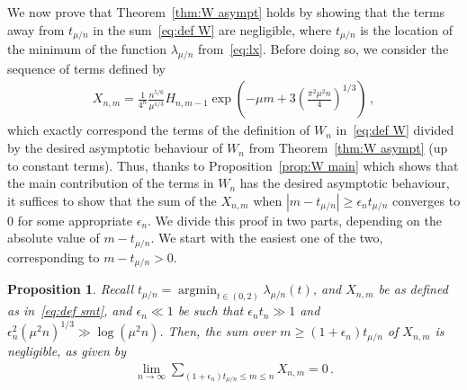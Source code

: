 \documentclass{article}
\DeclareMathOperator*{\argmin}{argmin}
\newcommand{\1}{\mathbbm{1}}								%
\newtheorem{proposition}[theorem]{Proposition}
\theoremstyle{definition}
\numberwithin{equation}{section}
\begin{document}
\def\smt{X}
We now prove that Theorem~\ref{thm:W asympt} holds by showing that the terms away from $t_{\mu/n}$ in the sum~\eqref{eq:def W} are negligible, where $t_{\mu/n}$ is the location of the minimum of the function $\lambda_{\mu/n}$ from~\eqref{eq:lx}. Before doing so, we consider the sequence of terms defined by
\begin{align}\label{eq:def smt}
    \smt_{n,m}=\frac{1}{4^n}\frac{n^{5/6}}{\mu^{1/3}}H_{n,m-1}\exp\left(-\mu m+3\left(\frac{\pi^2\mu^2n}{4}\right)^{1/3}\right)\,,
\end{align}
which exactly correspond the terms of the definition of $W_n$ in~\eqref{eq:def W} divided by the desired asymptotic behaviour of $W_n$ from Theorem~\ref{thm:W asympt} (up to constant terms).
Thus, thanks to Proposition~\ref{prop:W main} which shows that the main contribution of the terms in $W_n$ has the desired asymptotic behaviour, it suffices to show that the sum of the $\smt_{n,m}$ when $|m-t_{\mu/n}|\geq\epsilon_nt_{\mu/n}$ converges to $0$ for some appropriate $\epsilon_n$.
We divide this proof in two parts, depending on the absolute value of $m-t_{\mu/n}$.
We start with the easiest one of the two, corresponding to $m-t_{\mu/n}>0$.

\begin{proposition}\label{prop:negligible W+}
    {Recall $t_{\mu/n}=\argmin_{t \in (0,2)}\lambda_{\mu/n}(t)$, and} $\smt_{n,m}$ be as defined as in~\eqref{eq:def smt}, and $\epsilon_n\ll1$ be such that $\epsilon_nt_n\gg1$ and $\epsilon_n^2(\mu^2n)^{1/3}\gg\log(\mu^2n)$.
    Then, the sum over $m\geq(1+\epsilon_n)t_{\mu/n}$ of $\smt_{n,m}$ is negligible, as given by
    \begin{align*}
        \lim_{n\rightarrow\infty}\sum_{(1+\epsilon_n)t_{\mu/n}\leq m\leq n}\smt_{n,m}=0\,.
    \end{align*}
\end{proposition}
\end{document}
